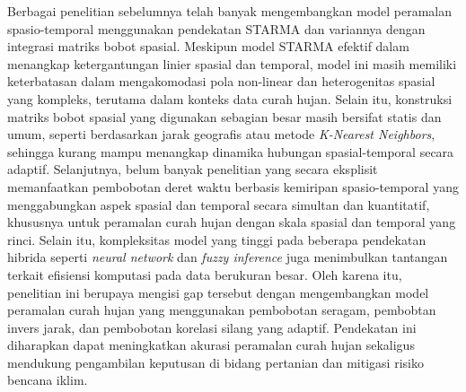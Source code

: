 \begin{enumerate}
    Berbagai penelitian sebelumnya telah banyak mengembangkan model peramalan spasio-temporal menggunakan pendekatan STARMA dan variannya dengan integrasi matriks bobot spasial. Meskipun model STARMA efektif dalam menangkap ketergantungan linier spasial dan temporal, model ini masih memiliki keterbatasan dalam mengakomodasi pola non-linear dan heterogenitas spasial yang kompleks, terutama dalam konteks data curah hujan. Selain itu, konstruksi matriks bobot spasial yang digunakan sebagian besar masih bersifat statis dan umum, seperti berdasarkan jarak geografis atau metode \textit{K-Nearest Neighbors}, sehingga kurang mampu menangkap dinamika hubungan spasial-temporal secara adaptif. Selanjutnya, belum banyak penelitian yang secara eksplisit memanfaatkan pembobotan deret waktu berbasis kemiripan spasio-temporal yang menggabungkan aspek spasial dan temporal secara simultan dan kuantitatif, khususnya untuk peramalan curah hujan dengan skala spasial dan temporal yang rinci. Selain itu, kompleksitas model yang tinggi pada beberapa pendekatan hibrida seperti \textit{neural network} dan \textit{fuzzy inference} juga menimbulkan tantangan terkait efisiensi komputasi pada data berukuran besar. Oleh karena itu, penelitian ini berupaya mengisi gap tersebut dengan mengembangkan model peramalan curah hujan yang menggunakan pembobotan seragam, pembobtan invers jarak, dan pembobotan korelasi silang yang adaptif. Pendekatan ini diharapkan dapat meningkatkan akurasi peramalan curah hujan sekaligus mendukung pengambilan keputusan di bidang pertanian dan mitigasi risiko bencana iklim.
\end{enumerate}